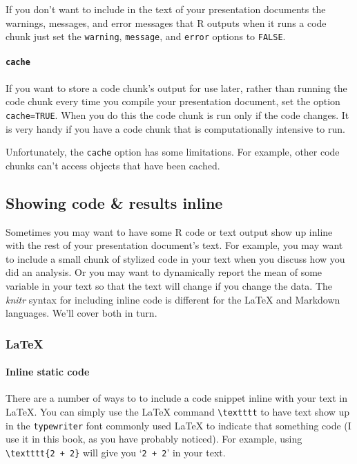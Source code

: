 If you don't want to include in the text of your presentation documents the warnings, messages, and error messages that R outputs when it runs a code chunk just set the \texttt{warning}, \texttt{message}, and \texttt{error} options to \texttt{FALSE}.

\paragraph{{\tt{cache}}}

If you want to store a code chunk's output for use later, rather than running the code chunk every time you compile your presentation document, set the option \texttt{cache=TRUE}. When you do this the code chunk is run only if the code changes. It is very handy if you have a code chunk that is computationally intensive to run. 

Unfortunately, the \texttt{cache} option has some limitations. For example, other code chunks can't access objects that have been cached.

\subsection{Showing code \& results inline}

Sometimes you may want to have some R code or text output show up inline with the rest of your presentation document's text. For example, you may want to include a small chunk of stylized code in your text when you discuss how you did an analysis. Or you may want to dynamically report the mean of some variable in your text so that the text will change if you change the data. The {\emph{knitr}} syntax for including inline code is different for the LaTeX and Markdown languages. We'll cover both in turn.

\subsubsection{LaTeX}

\paragraph{Inline static code}

There are a number of ways to to include a code snippet inline with your text in LaTeX. You can simply use the LaTeX command \verb|\textttt| to have text show up in the \texttt{typewriter} font commonly used LaTeX to indicate that something code (I use it in this book, as you have probably noticed). For example, using \verb|\textttt{2 + 2}| will give you `\texttt{2 + 2}' in your text.

